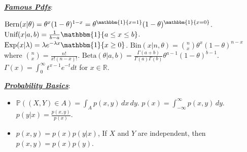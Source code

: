\documentclass[10pt]{article}
\newcommand{\bulletPoint}[1]{\ul{\textit{\textbf{#1}}}}
\begin{document}
\singlespacing
\begin{multicols*}{3}
\scriptsize
\raggedright


\bulletPoint{Famous Pdfs}:\quad

$\text{Bern}(x | \theta) = \theta^x (1 - \theta)^{1-x}=\theta^{\mathbbm{1}\{x=1\}} (1 - \theta)^{\mathbbm{1}\{x=0\}}$.
$\text{Unif}(x | a, b) = \frac{1}{b-a}  \mathbbm{1}\{a \leq x \leq b\}$.\quad
$\text{Exp}(x | \lambda) = \lambda e^{-\lambda x} \mathbbm{1}\{x \geq 0\}$.
$\text{Bin}(x | n, \theta) = \binom{n}{x} \theta^x (1 - \theta)^{n-x}$
where $\binom{n}{x} = \frac{n!}{x!(n-x)!}$.
$\text{Beta}(\theta | a, b) = \frac{\Gamma(a+b)}{\Gamma(a) \Gamma(b)} \theta^{a-1} (1-\theta)^{b-1}$.
$\Gamma(x) = \int_0^\infty t^{x-1} e^{-t} dt$ for $x \in \mathbb{R}$.

\bulletPoint{Probability Basics}:

\begin{itemize}[label=$\cdot$,leftmargin=0pt]
\item$\mathbb{P}((X,Y) \in A) = \int_A p(x,y) \,dx\,dy$. \quad
$p(x) = \int_{-\infty}^{\infty} p(x,y) \,dy$.\quad
$p(y | x) = \frac{p(x,y)}{p(x)}$.
\item$p(x,y) = p(x)p(y | x)$, 
If \(X\) and \(Y\) are independent, then \( p(x,y) = p(x)p(y) \).


\end{itemize}
\end{multicols*}
\end{document}
